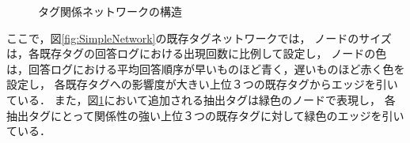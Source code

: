 \begin{figure}[H]
\begin{center}
\hspace*{-20pt}
\end{center}
\caption{タグ関係ネットワークの構造}
\label{fig:Network}
\end{figure}

ここで，図\ref{fig:SimpleNetwork}の既存タグネットワークでは，
ノードのサイズは，各既存タグの回答ログにおける出現回数に比例して設定し，
ノードの色は，回答ログにおける平均回答順序が早いものほど青く，遅いものほど赤く色を設定し，
各既存タグへの影響度が大きい上位３つの既存タグからエッジを引いている．
また，図\ref{fig:Network}において追加される抽出タグは緑色のノードで表現し，
各抽出タグにとって関係性の強い上位３つの既存タグに対して緑色のエッジを引いている．

